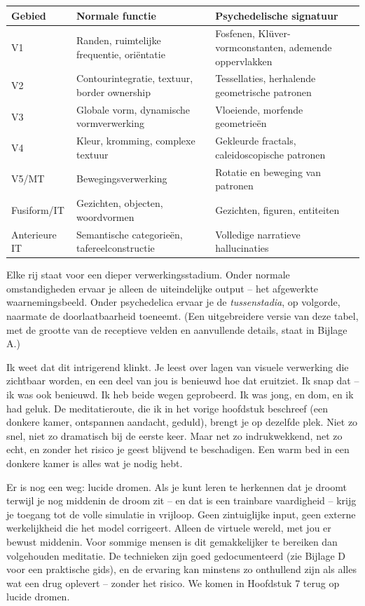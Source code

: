 \documentclass[11pt, twoside, openright]{book}
\begin{document}
\small
\begin{xltabular}{\linewidth}{X X X}
\toprule
\textbf{Gebied} & \textbf{Normale functie} & \textbf{Psychedelische signatuur} \\
\midrule\endhead
V1 & Randen, ruimtelijke frequentie, oriëntatie & Fosfenen, Klüver-vormconstanten, ademende oppervlakken \\[4pt]
V2 & Contourintegratie, textuur, border ownership & Tessellaties, herhalende geometrische patronen \\[4pt]
V3 & Globale vorm, dynamische vormverwerking & Vloeiende, morfende geometrieën \\[4pt]
V4 & Kleur, kromming, complexe textuur & Gekleurde fractals, caleidoscopische patronen \\[4pt]
V5/\allowbreak{}MT & Bewegingsverwerking & Rotatie en beweging van patronen \\[4pt]
Fusiform/\allowbreak{}IT & Gezichten, objecten, woordvormen & Gezichten, figuren, entiteiten \\[4pt]
Anterieure IT & Semantische categorieën, tafereelconstructie & Volledige narratieve hallucinaties \\[4pt]
\bottomrule
\end{xltabular}
\normalsize


Elke rij staat voor een dieper verwerkingsstadium. Onder normale omstandigheden ervaar je alleen de uiteindelijke output -- het afgewerkte waarnemingsbeeld. Onder psychedelica ervaar je de \textit{tussenstadia}, op volgorde, naarmate de doorlaatbaarheid toeneemt. (Een uitgebreidere versie van deze tabel, met de grootte van de receptieve velden en aanvullende details, staat in Bijlage A.)

Ik weet dat dit intrigerend klinkt. Je leest over lagen van visuele verwerking die zichtbaar worden, en een deel van jou is benieuwd hoe dat eruitziet. Ik snap dat -- ik was ook benieuwd. Ik heb beide wegen geprobeerd. Ik was jong, en dom, en ik had geluk. De meditatieroute, die ik in het vorige hoofdstuk beschreef (een donkere kamer, ontspannen aandacht, geduld), brengt je op dezelfde plek. Niet zo snel, niet zo dramatisch bij de eerste keer. Maar net zo indrukwekkend, net zo echt, en zonder het risico je geest blijvend te beschadigen. Een warm bed in een donkere kamer is alles wat je nodig hebt.

Er is nog een weg: lucide dromen. Als je kunt leren te herkennen dat je droomt terwijl je nog middenin de droom zit -- en dat is een trainbare vaardigheid -- krijg je toegang tot de volle simulatie in vrijloop. Geen zintuiglijke input, geen externe werkelijkheid die het model corrigeert. Alleen de virtuele wereld, met jou er bewust middenin. Voor sommige mensen is dit gemakkelijker te bereiken dan volgehouden meditatie. De technieken zijn goed gedocumenteerd (zie Bijlage D voor een praktische gids), en de ervaring kan minstens zo onthullend zijn als alles wat een drug oplevert -- zonder het risico. We komen in Hoofdstuk 7 terug op lucide dromen.
\end{document}
